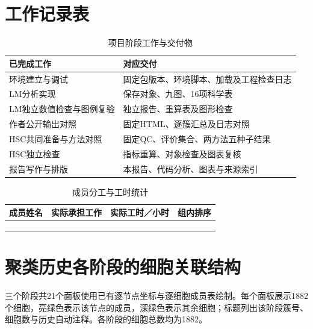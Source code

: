 \section{工作记录表}
\begin{table}[!htbp]
\centering{}
\caption{项目阶段工作与交付物}\label{tab:8}
\begin{tabularx}{\linewidth}{>{\raggedright\arraybackslash}X>{\raggedright\arraybackslash}X}
\toprule
已完成工作 & 对应交付 \\
\midrule
环境建立与调试 & 固定包版本、环境脚本、加载及工程检查日志 \\
LM分析实现 & 保存对象、九图、16项科学表 \\
LM独立数值检查与图例复验 & 独立报告、重算表及图形检查 \\
作者公开输出对照 & 固定HTML、逐簇汇总及日志对照 \\
HSC共同准备与方法对照 & 固定QC、评价集合、两方法五种子结果 \\
HSC独立检查 & 指标重算、对象检查及图表复核 \\
报告写作与排版 & 本报告、代码分析、图表与来源索引 \\
\bottomrule
\end{tabularx}
\end{table}

\begin{table}[!htbp]
\centering{}
\caption{成员分工与工时统计}\label{tab:9}
\begin{tabularx}{\linewidth}{>{\raggedright\arraybackslash}X>{\raggedright\arraybackslash}X>{\raggedright\arraybackslash}X>{\raggedright\arraybackslash}X}
\toprule
成员姓名 & 实际承担工作 & 实际工时／小时 & 组内排序 \\
\midrule
 &  &  &  \\
 &  &  &  \\
 &  &  &  \\
\bottomrule
\end{tabularx}
\end{table}

\section{聚类历史各阶段的细胞关联结构}
三个阶段共\allowbreak{}21个面板使用已有逐节点坐标与逐细胞成员表绘制。每个面板展示\allowbreak{}1882个细胞，亮绿色表示该节点的成员，深绿色表示其余细胞；标题列出该阶段簇号、细胞数与历史自动注释。各阶段的细胞总数均为\allowbreak{}1882。

